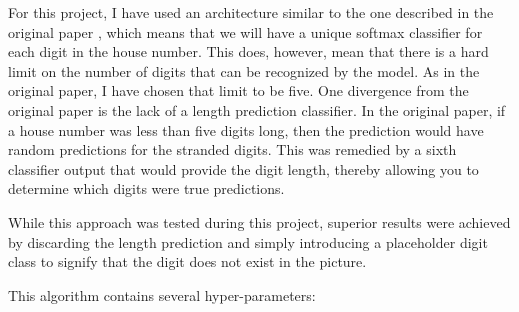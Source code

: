 \documentclass[12pt]{article}
\begin{document}
For this project, I have used an architecture similar to the one described in the original paper \cite{svhn_original_paper}, which means that we will have a unique softmax classifier for each digit in the house number.
This does, however, mean that there is a hard limit on the number of digits that can be recognized by the model.
As in the original paper, I have chosen that limit to be five.
One divergence from the original paper is the lack of a length prediction classifier.
In the original paper, if a house number was less than five digits long, then the prediction would have random predictions for the stranded digits.
This was remedied by a sixth classifier output that would provide the digit length, thereby allowing you to determine which digits were true predictions.

While this approach was tested during this project, superior results were achieved by discarding the length prediction and simply introducing a placeholder digit class to signify that the digit does not exist in the picture.

This algorithm contains several hyper-parameters:
\end{document}
